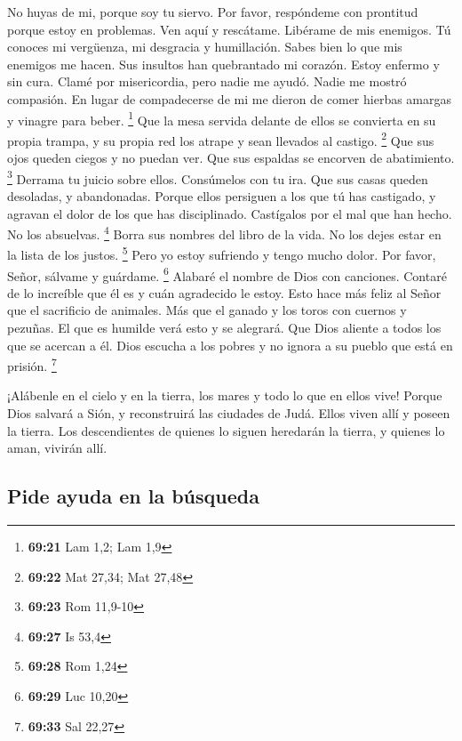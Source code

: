  No huyas de mi, porque soy tu siervo. Por favor,
respóndeme con prontitud porque estoy en problemas.  Ven
aquí y rescátame. Libérame de mis enemigos.  Tú conoces mi
vergüenza, mi desgracia y humillación. Sabes bien lo que mis enemigos me
hacen.  Sus insultos han quebrantado mi corazón. Estoy
enfermo y sin cura. Clamé por misericordia, pero nadie me ayudó. Nadie
me mostró compasión.  En lugar de compadecerse de mi me
dieron de comer hierbas amargas y vinagre para beber. \footnote{\textbf{69:21}
  Lam 1,2; Lam 1,9}  Que la mesa servida delante de ellos
se convierta en su propia trampa, y su propia red los atrape y sean
llevados al castigo. \footnote{\textbf{69:22} Mat 27,34; Mat 27,48}
 Que sus ojos queden ciegos y no puedan ver. Que sus
espaldas se encorven de abatimiento. \footnote{\textbf{69:23} Rom
  11,9-10}  Derrama tu juicio sobre ellos. Consúmelos con
tu ira.  Que sus casas queden desoladas, y abandonadas.
 Porque ellos persiguen a los que tú has castigado, y
agravan el dolor de los que has disciplinado.  Castígalos
por el mal que han hecho. No los absuelvas. \footnote{\textbf{69:27} Is
  53,4}  Borra sus nombres del libro de la vida. No los
dejes estar en la lista de los justos. \footnote{\textbf{69:28} Rom 1,24}
 Pero yo estoy sufriendo y tengo mucho dolor. Por favor,
Señor, sálvame y guárdame. \footnote{\textbf{69:29} Luc 10,20}
 Alabaré el nombre de Dios con canciones. Contaré de lo
increíble que él es y cuán agradecido le estoy.  Esto hace
más feliz al Señor que el sacrificio de animales. Más que el ganado y
los toros con cuernos y pezuñas.  El que es humilde verá
esto y se alegrará. Que Dios aliente a todos los que se acercan a él.
 Dios escucha a los pobres y no ignora a su pueblo que está
en prisión. \footnote{\textbf{69:33} Sal 22,27}

 ¡Alábenle en el cielo y en la tierra, los mares y todo lo
que en ellos vive!  Porque Dios salvará a Sión, y
reconstruirá las ciudades de Judá. Ellos viven allí y poseen la tierra.
 Los descendientes de quienes lo siguen heredarán la
tierra, y quienes lo aman, vivirán allí.

\hypertarget{pide-ayuda-en-la-buxfasqueda}{%
\subsection{Pide ayuda en la
búsqueda}\label{pide-ayuda-en-la-buxfasqueda}}

